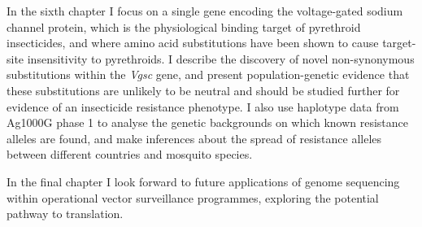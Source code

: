 \begin{refsection}
In the sixth chapter I focus on a single gene encoding the voltage-gated sodium channel protein, which is the physiological binding target of pyrethroid insecticides, and where amino acid substitutions have been shown to cause target-site insensitivity to pyrethroids.
%
I describe the discovery of novel non-synonymous substitutions within the \textit{Vgsc} gene, and present population-genetic evidence that these substitutions are unlikely to be neutral and should be studied further for evidence of an insecticide resistance phenotype.
%
I also use haplotype data from Ag1000G phase 1 to analyse the genetic backgrounds on which known resistance alleles are found, and make inferences about the spread of resistance alleles between different countries and mosquito species.


In the final chapter I look forward to future applications of genome sequencing within operational vector surveillance programmes, exploring the potential pathway to translation. 


\printbibliography[
heading=subbibintoc,
title={References}
]

\end{refsection}
